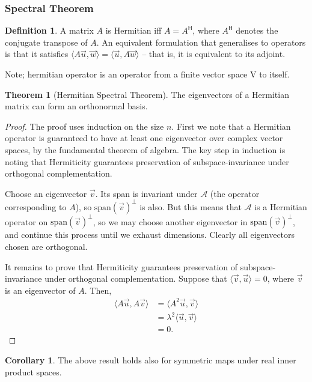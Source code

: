 \documentclass{article}
\theoremstyle{definition}
\newtheorem{thm}{Theorem}[subsubsection]
\newtheorem{defn}{Definition}[subsubsection]
\newtheorem{cor}{Corollary}[subsubsection]
\begin{document}
\subsubsection{Spectral Theorem}\label{spec}
\begin{defn}
	A matrix $A$ is Hermitian iff $A=A^\mathsf{H}$, where $A^\mathsf{H}$ denotes the conjugate transpose of $A$. An equivalent formulation that generalises to operators is that it satisfies $\langle A\vec u, \vec w\rangle=\langle\vec u, A\vec w\rangle$ -- that is, it is equivalent to its adjoint.
\end{defn}
Note; hermitian operator is an operator from a finite vector space V to itself.
\begin{thm}[Hermitian Spectral Theorem]
	The eigenvectors of a Hermitian matrix can form an orthonormal basis.
\end{thm}
\begin{proof}
	The proof uses induction on the size $n$. First we note that a Hermitian operator is guaranteed to have at least one eigenvector over complex vector spaces, by the fundamental theorem of algebra. The key step in induction is noting that Hermiticity guarantees preservation of subspace-invariance under orthogonal complementation.\par
	Choose an eigenvector $\vec v$. Its span is invariant under $\mathcal{A}$ (the operator corresponding to $A$), so $\text{span}(\vec v)^\perp$ is also. But this means that $\mathcal{A}$ is a Hermitian operator on $\text{span}(\vec v)^\perp$, so we may choose another eigenvector in $\text{span}(\vec v)^\perp$, and continue this process until we exhaust dimensions. Clearly all eigenvectors chosen are orthogonal.\par
	It remains to prove that Hermiticity guarantees preservation of subspace-invariance under orthogonal complementation. Suppose that $\langle\vec v, \vec u\rangle=0$, where $\vec v$ is an eigenvector of $A$. Then, 
	\begin{align*}
		\langle A\vec u, A\vec v\rangle&=\langle A^2\vec u, \vec v\rangle\\
		&=\lambda^2\langle\vec u, \vec v\rangle\\
		&=0.
	\end{align*}
\end{proof}
\begin{cor}
	The above result holds also for symmetric maps under real inner product spaces.
\end{cor}
\end{document}
